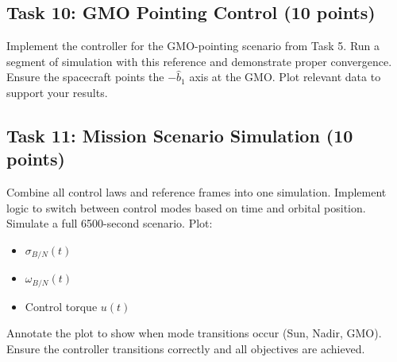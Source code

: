 \documentclass[12pt]{article}
\begin{document}
\subsection{Task 10: GMO Pointing Control (10 points)}
Implement the controller for the GMO-pointing scenario from Task 5. Run a segment of simulation with this reference and demonstrate proper convergence. Ensure the spacecraft points the \(-\hat{b}_1\) axis at the GMO. Plot relevant data to support your results.

\subsection{Task 11: Mission Scenario Simulation (10 points)}
Combine all control laws and reference frames into one simulation. Implement logic to switch between control modes based on time and orbital position. Simulate a full 6500-second scenario. Plot:
\begin{itemize}
  \item \(\sigma_{B/N}(t)\)
  \item \(\omega_{B/N}(t)\)
  \item Control torque \(u(t)\)
\end{itemize}
Annotate the plot to show when mode transitions occur (Sun, Nadir, GMO). Ensure the controller transitions correctly and all objectives are achieved.
\end{document}
